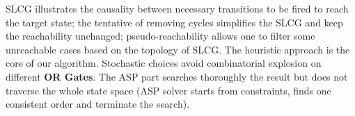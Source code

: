 SLCG illustrates the causality between necessary transitions to be fired to reach the target state; 
the tentative of removing cycles simplifies the SLCG and keep the reachability unchanged; 
pseudo-reachability allows one to filter some unreachable cases based on the topology of SLCG. 
The heuristic approach is the core of our algorithm.
Stochastic choices avoid combinatorial explosion on different \textbf{OR Gates}.
The ASP part searches thoroughly the result but does not traverse the whole state space (ASP solver starts from constraints, finds one consistent order and terminate the search). 

